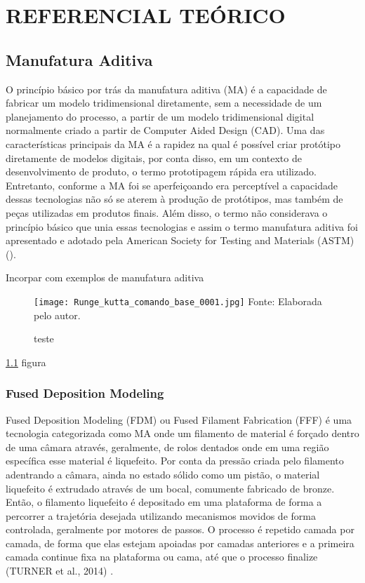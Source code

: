 \chapter{REFERENCIAL TEÓRICO}

\section{Manufatura Aditiva}
O princípio básico por trás da manufatura aditiva (MA) é a 
capacidade de fabricar um modelo tridimensional diretamente, 
sem a necessidade de um planejamento do processo, a partir de 
um modelo tridimensional digital normalmente criado a partir 
de Computer Aided Design (CAD). Uma das características 
principais da MA é a rapidez na qual é possível criar protótipo
diretamente de modelos digitais, por conta disso, em um contexto 
de desenvolvimento de produto, o termo prototipagem rápida era 
utilizado. Entretanto, conforme a MA foi se aperfeiçoando era 
perceptível a capacidade dessas tecnologias não só se aterem à 
produção de protótipos, mas também de peças utilizadas em 
produtos finais. Além disso, o termo não considerava o princípio 
básico que unia essas tecnologias e assim o termo manufatura 
aditiva foi apresentado e adotado pela American Society for 
Testing and Materials (ASTM) \citeauthor{gibson15} (\citeyear{gibson15}).

Incorpar com exemplos de manufatura aditiva

\begin{figure}[!htb]
    \centering
    \caption{teste}
    \texttt{[image: Runge\_kutta\_comando\_base\_0001.jpg]}
    {\footnotesize Fonte: Elaborada pelo autor.}
    \label{fig:label}
\end{figure}

\ref{fig:label} figura

\subsection{Fused Deposition Modeling}
Fused Deposition Modeling (FDM) ou Fused Filament Fabrication 
(FFF) é uma tecnologia categorizada como MA onde um filamento 
de material é forçado dentro de uma câmara através, geralmente,
de rolos dentados onde em uma região específica esse material 
é liquefeito. Por conta da pressão criada pelo filamento 
adentrando a câmara, ainda no estado sólido como um pistão, 
o material liquefeito é extrudado através de um bocal, 
comumente fabricado de bronze. Então, o filamento liquefeito é 
depositado em uma plataforma de forma a percorrer a trajetória 
desejada utilizando mecanismos movidos de forma controlada, 
geralmente por motores de passos. O processo é repetido camada 
por camada, de forma que elas estejam apoiadas por camadas 
anteriores e a primeira camada continue fixa na plataforma ou 
cama, até que o processo finalize (TURNER et al., 2014) \cite{turner14}.

